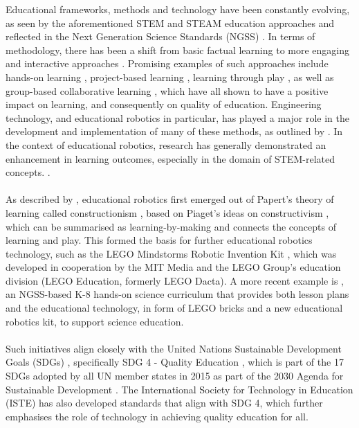 Educational frameworks, methods and technology have been constantly evolving, as seen by the aforementioned STEM and STEAM education approaches and reflected in the Next Generation Science Standards (NGSS) \citep{noauthor_next_2013}. In terms of methodology, there has been a shift from basic factual learning to more engaging and interactive approaches \citep{atkin_inside_2003, noauthor_next_2013, }. Promising examples of such approaches include hands-on learning \citep{satterthwait_why_2010, vesilind_hands-_1996}, project-based learning \citep{sawyer_project-based_2014, kokotsaki_project-based_2016, samsudin_effect_2020, markula_key_2022}, learning through play \citep{weisberg_guided_2013, zosh_learning_2017, parker_learning_2022}, as well as group-based collaborative learning \citep{tonkal_exploring_2024, brennan_implementing_2023}, which have all shown to have a positive impact on learning, and consequently on quality of education. Engineering technology, and educational robotics in particular, has played a major role in the development and implementation of many of these methods, as outlined by \citet{khine_robotics_2017}. In the context of educational robotics, research has generally demonstrated an enhancement in learning outcomes, especially in the domain of STEM-related concepts. \citep{benitti_exploring_2012, lego_education_stem_nodate, afari_robotics_2017}. 
\\\\
As described by \citet{sapounidis_educational_2020}, educational robotics first emerged out of Papert's theory of learning called constructionism \citep{papert_constructionism_1991}, based on Piaget’s ideas on constructivism \citep{von_glasersfeld_interpretation_1982}, which can be summarised as learning-by-making and connects the concepts of learning and play. This formed the basis for further educational robotics technology, such 
as the LEGO Mindstorms Robotic Invention Kit \citep{mindell_lego_2000}, which was developed in cooperation by the MIT Media and the LEGO Group's education division (LEGO Education, formerly LEGO Dacta).
A more recent example is \citet{noauthor_lego_nodate}, an NGSS-based K-8 hands-on science curriculum that provides both lesson plans and the educational technology, in form of LEGO bricks and a new educational robotics kit, to support science education. \citep{lego_education_stem_nodate} 
\\\\
Such initiatives align closely with the United Nations Sustainable Development Goals (SDGs) \citet{united_nations_department_of_economic_and_social_affairs_17_nodate}, specifically SDG 4 - Quality Education \citep{united_nations_department_of_economic_and_social_affairs_goal_nodate}, which is part of the 17 SDGs  adopted by all UN member states in 2015 as part of the 2030 Agenda for Sustainable Development \citet{united_nations_department_of_economics_and_social_affairs_sustainable_nodate}. The International Society for Technology in Education (ISTE) has also developed standards that align with SDG 4, which further emphasises the role of technology in achieving quality education for all. \citep{iste_iste_nodate, noauthor_technology_2023}
